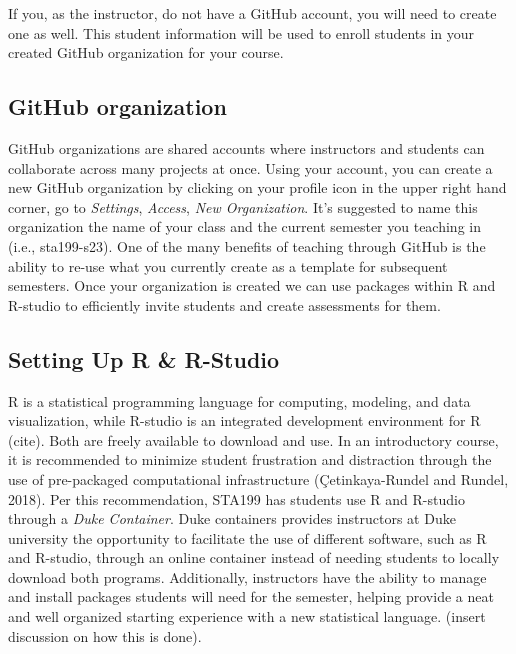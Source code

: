 \documentclass[
  12pt]{article}
\begin{document}
If you, as the instructor, do not have a GitHub account, you will need
to create one as well. This student information will be used to enroll
students in your created GitHub organization for your course.

\hypertarget{github-organization}{%
\subsection{GitHub organization}\label{github-organization}}

GitHub organizations are shared accounts where instructors and students
can collaborate across many projects at once. Using your account, you
can create a new GitHub organization by clicking on your profile icon in
the upper right hand corner, go to \emph{Settings}, \emph{Access},
\emph{New Organization}. It's suggested to name this organization the
name of your class and the current semester you teaching in (i.e.,
sta199-s23). One of the many benefits of teaching through GitHub is the
ability to re-use what you currently create as a template for subsequent
semesters. Once your organization is created we can use packages within
R and R-studio to efficiently invite students and create assessments for
them.

\hypertarget{setting-up-r-r-studio}{%
\subsection{Setting Up R \& R-Studio}\label{setting-up-r-r-studio}}

R is a statistical programming language for computing, modeling, and
data visualization, while R-studio is an integrated development
environment for R (cite). Both are freely available to download and use.
In an introductory course, it is recommended to minimize student
frustration and distraction through the use of pre-packaged
computational infrastructure (Çetinkaya-Rundel and Rundel, 2018). Per
this recommendation, STA199 has students use R and R-studio through a
\emph{Duke Container}. Duke containers provides instructors at Duke
university the opportunity to facilitate the use of different software,
such as R and R-studio, through an online container instead of needing
students to locally download both programs. Additionally, instructors
have the ability to manage and install packages students will need for
the semester, helping provide a neat and well organized starting
experience with a new statistical language. (insert discussion on how
this is done).
\end{document}
